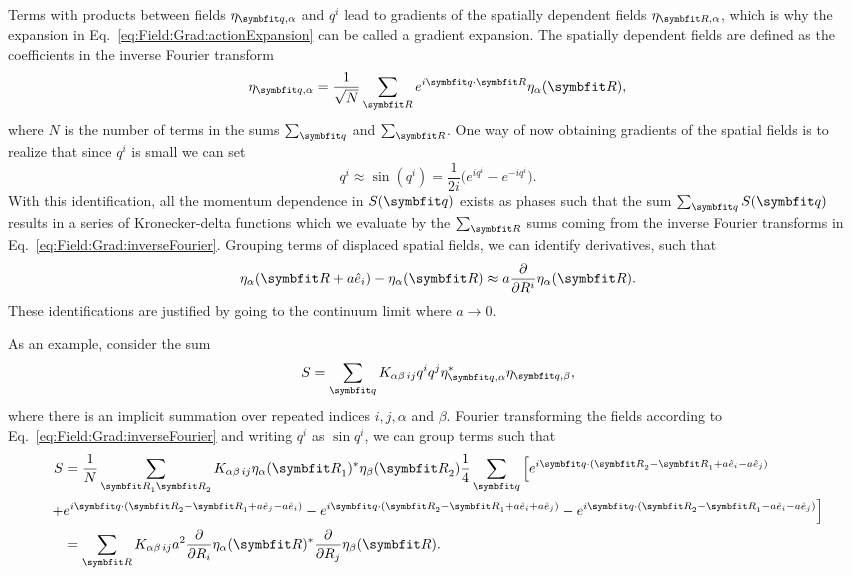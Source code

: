 Terms with products between fields $\eta_{\v{q},\alpha}$ and $q^i$ lead to gradients of the spatially dependent fields $\eta_{\v{R},\alpha}$, which is why the
expansion in Eq.~\eqref{eq:Field:Grad:actionExpansion} can be called a gradient expansion. The spatially dependent fields are defined as the coefficients in the inverse Fourier transform
\begin{equation}
    \label{eq:Field:Grad:inverseFourier}
    \eta_{\v{q},\alpha} = \frac{1}{\sqrt{N}}\sum_\v{R}e^{i\v{q}\cdot\v{R}}\eta_{\alpha}(\v{R}),
\end{equation}
where $N$ is the number of terms in the sums $\sum_\v{q}$ and $\sum_\v{R}$. One way of now obtaining gradients of the spatial fields is to
realize that since $q^i$ is small we can set
\begin{equation}
    \label{eq:Field:Grad:exponential}
    q^i \approx \sin(q^i) = \frac{1}{2i}\Big(e^{iq^i} - e^{-iq^i}\Big).
\end{equation}
With this identification, all the momentum dependence in $S(\v{q})$ exists as phases such that the sum $\sum_\v{q}S(\v{q})$ results in a series of
Kronecker-delta functions which we evaluate by the $\sum_\v{R}$ sums coming from the inverse Fourier transforms in Eq.~\eqref{eq:Field:Grad:inverseFourier}.
Grouping terms of displaced spatial fields, we can identify derivatives, such that
\begin{equation}
    \label{eq:Field:Grad:derivativeId}
    \eta_\alpha(\v{R}+a\hat{e}_i) - \eta_\alpha(\v{R}) \approx a\frac{\partial}{\partial R^i}\eta_\alpha(\v{R}).
\end{equation}
These identifications are justified by going to the continuum limit where $a\to0$.

As an example, consider the sum
\begin{equation}
    \label{eq:Field:Grad:Ex:sum}
    S = \sum_\v{q}K_{\alpha\beta\,ij}q^iq^j\eta_{\v{q},\alpha}^\ast\eta_{\v{q},\beta},
\end{equation}
where there is an implicit summation over repeated indices $i,j,\alpha$ and $\beta$. Fourier transforming the fields according to Eq.~\eqref{eq:Field:Grad:inverseFourier}
and writing $q^i$ as $\sin q^i$, we can group terms such that
\begin{equation}
    \label{eq:Field:Grad:Ex:calculation}
    \begin{split}
        S &= \frac{1}{N}\sum_{\v{R}_1\v{R}_2}K_{\alpha\beta\,ij}\eta_\alpha(\v{R}_1)^\ast\eta_\beta(\v{R}_2)\frac{1}{4}\sum_\v{q}\Big[e^{i\v{q}\cdot(\v{R}_2-\v{R}_1+a\hat{e}_i-a\hat{e}_j)}\\
        + &e^{i\v{q}\cdot(\v{R}_2-\v{R}_1+a\hat{e}_j-a\hat{e}_i)} - e^{i\v{q}\cdot(\v{R}_2-\v{R}_1+a\hat{e}_i+a\hat{e}_j)} - e^{i\v{q}\cdot(\v{R}_2-\v{R}_1-a\hat{e}_i-a\hat{e}_j)}\Big]\\
        &= \sum_{\v{R}}K_{\alpha\beta\,ij}a^2\frac{\partial}{\partial R_i}\eta_\alpha(\v{R})^\ast\frac{\partial}{\partial R_j}\eta_\beta(\v{R}).
    \end{split}
\end{equation}

